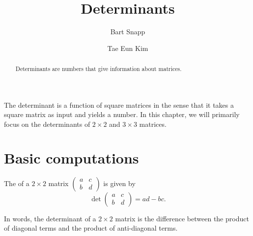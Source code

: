 \documentclass{ximera}
\author{Bart Snapp \and Tae Eun Kim}
\title{Determinants}
\begin{document}
\begin{abstract}
  Determinants are numbers that give information about matrices.
\end{abstract}
\maketitle

The determinant is a function of square matrices in the sense that it
takes a square matrix as input and yields a number. In this chapter,
we will primarily focus on the determinants of $2 \times 2$ and
$3 \times 3$ matrices.

\section{Basic computations}

\begin{definition}
  The  of a $2 \times 2$ matrix $\begin{pmatrix} a & c \\
    b & d \end{pmatrix}$ is given by
  \[
    \det
    \begin{pmatrix}
      a & c\\
      b & d
    \end{pmatrix}
    = ad - bc.
  \]
\end{definition}

In words, the determinant of a $2\times 2$ matrix is the difference between
the product of diagonal terms and the product of anti-diagonal terms.
\begin{image}[0.75in]
\end{image}
\end{document}

